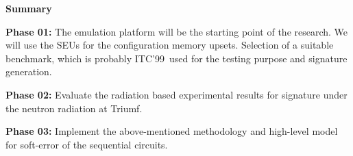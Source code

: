 \textbf{Summary}

\textbf{Phase  01:} The emulation platform will be the starting point of the research. We will use the SEUs for the configuration memory upsets. Selection of a suitable benchmark, which is probably ITC'99~\citep{ITC}used for the testing purpose and signature generation.

\textbf{Phase  02:} Evaluate the radiation based experimental results for signature under the neutron radiation at Triumf.


\textbf{Phase 03:} Implement the above-mentioned methodology and high-level model for soft-error of the sequential circuits.











